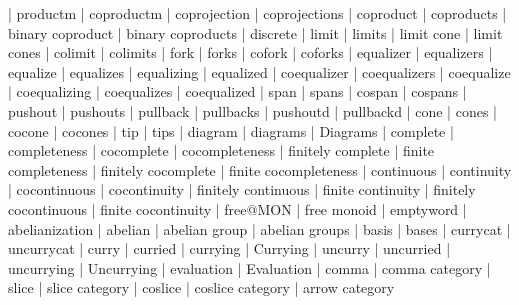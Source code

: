     |   productm
    |   coproductm
    |   coprojection
    |   coprojections
    |   coproduct
    |   coproducts
    |   binary coproduct
    |   binary coproducts
    |   discrete
    |   limit
    |   limits
    |   limit cone
    |   limit cones
    |   colimit
    |   colimits
    |   fork
    |   forks
    |   cofork
    |   coforks
    |   equalizer
    |   equalizers
    |   equalize
    |   equalizes
    |   equalizing
    |   equalized
    |   coequalizer
    |   coequalizers
    |   coequalize
    |   coequalizing
    |   coequalizes
    |   coequalized
    |   span
    |   spans
    |   cospan
    |   cospans
    |   pushout
    |   pushouts
    |   pullback
    |   pullbacks
    |   pushoutd
    |   pullbackd
    |   cone
    |   cones
    |   cocone
    |   cocones
    |   tip
    |   tips
    |   diagram
    |   diagrams
    |   Diagrams
    |   complete
    |   completeness
    |   cocomplete
    |   cocompleteness
    |   finitely complete
    |   finite completeness
    |   finitely cocomplete
    |   finite cocompleteness
    |   continuous
    |   continuity
    |   cocontinuous
    |   cocontinuity
    |   finitely continuous
    |   finite continuity
    |   finitely cocontinuous
    |   finite cocontinuity
    |   free@MON
    |   free monoid
    |   emptyword
    |   abelianization
    |   abelian
    |   abelian group
    |   abelian groups
    |   basis
    |   bases
    |   currycat
    |   uncurrycat
    |   curry
    |   curried
    |   currying
    |   Currying
    |   uncurry
    |   uncurried
    |   uncurrying
    |   Uncurrying
    |   evaluation
    |   Evaluation
    |   comma
    |   comma category
    |   slice
    |   slice category
    |   coslice
    |   coslice category
    |   arrow category

